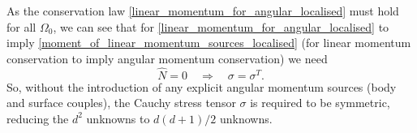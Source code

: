 As the conservation law \eqref{linear_momentum_for_angular_localised} must hold for all $\Omega_0$, we can see that for \eqref{linear_momentum_for_angular_localised}
to imply \eqref{moment_of_linear_momentum_sources_localised} (for linear momentum conservation to imply angular momentum conservation) we need
\begin{equation}
    \widehat{N} = 0 \quad\Rightarrow\quad \sigma = \sigma^T.
\end{equation}
So, without the introduction of any explicit angular momentum sources (body and surface couples), the Cauchy stress tensor $\sigma$ is required to be symmetric,
reducing the $d^2$ unknowns to $d(d+1)/2$ unknowns.




